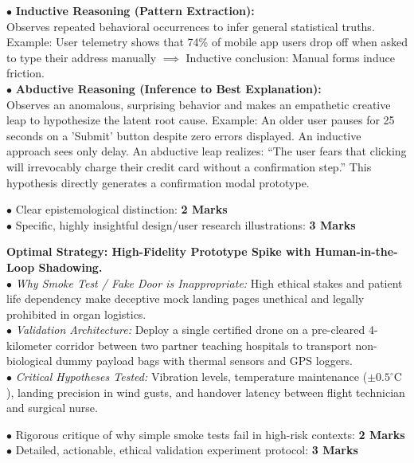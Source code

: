 \begin{solutionbox}
$\bullet$ \textbf{Inductive Reasoning (Pattern Extraction):}\\
Observes repeated behavioral occurrences to infer general statistical truths. Example: User telemetry shows that 74\% of mobile app users drop off when asked to type their address manually $\implies$ Inductive conclusion: Manual forms induce friction.\\
$\bullet$ \textbf{Abductive Reasoning (Inference to Best Explanation):}\\
Observes an anomalous, surprising behavior and makes an empathetic creative leap to hypothesize the latent root cause. Example: An older user pauses for 25 seconds on a 'Submit' button despite zero errors displayed. An inductive approach sees only delay. An abductive leap realizes: ``The user fears that clicking will irrevocably charge their credit card without a confirmation step.'' This hypothesis directly generates a confirmation modal prototype.
\begin{markingrubric}
$\bullet$ Clear epistemological distinction: \textbf{2 Marks}\\
$\bullet$ Specific, highly insightful design/user research illustrations: \textbf{3 Marks}
\end{markingrubric}
\end{solutionbox}

\begin{solutionbox}
\textbf{Optimal Strategy: High-Fidelity Prototype Spike with Human-in-the-Loop Shadowing.}\\
$\bullet$ \textit{Why Smoke Test / Fake Door is Inappropriate:} High ethical stakes and patient life dependency make deceptive mock landing pages unethical and legally prohibited in organ logistics.\\
$\bullet$ \textit{Validation Architecture:} Deploy a single certified drone on a pre-cleared 4-kilometer corridor between two partner teaching hospitals to transport non-biological dummy payload bags with thermal sensors and GPS loggers.\\
$\bullet$ \textit{Critical Hypotheses Tested:} Vibration levels, temperature maintenance ($\pm 0.5^\circ\text{C}$), landing precision in wind gusts, and handover latency between flight technician and surgical nurse.
\begin{markingrubric}
$\bullet$ Rigorous critique of why simple smoke tests fail in high-risk contexts: \textbf{2 Marks}\\
$\bullet$ Detailed, actionable, ethical validation experiment protocol: \textbf{3 Marks}
\end{markingrubric}
\end{solutionbox}

